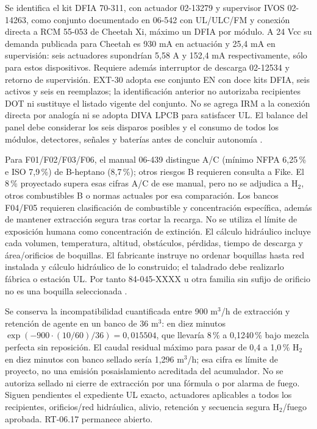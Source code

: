 Se identifica el kit DFIA 70-311, con actuador 02-13279 y supervisor IVOS 02-14263, como conjunto documentado en 06-542 con UL/ULC/FM y conexión directa a RCM 55-053 de Cheetah Xi, máximo un DFIA por módulo. A 24 Vcc su demanda publicada para Cheetah es 930 mA en actuación y 25,4 mA en supervisión: seis actuadores supondrían 5,58 A y 152,4 mA respectivamente, sólo para estos dispositivos. Requiere además interruptor de descarga 02-12534 y retorno de supervisión. EXT-30 adopta ese conjunto EN con doce kits DFIA, seis activos y seis en reemplazos; la identificación anterior no autorizaba recipientes DOT ni sustituye el listado vigente del conjunto. No se agrega IRM a la conexión directa por analogía ni se adopta DIVA LPCB para satisfacer UL. El balance del panel debe considerar los seis disparos posibles y el consumo de todos los módulos, detectores, señales y baterías antes de concluir autonomía \parencite[ficha~06-432-1-5-DF, pp.~1--6]{l27-fike-542}.

Para F01/F02/F03/F06, el manual 06-439 distingue A/C (mínimo NFPA 6,25\,\% e ISO 7,9\,\%) de B-heptano (8,7\,\%); otros riesgos B requieren consulta a Fike. El 8\,\% proyectado supera esas cifras A/C de ese manual, pero no se adjudica a H$_2$, otros combustibles B o normas actuales por esa comparación. Los bancos F04/F05 requieren clasificación de combustible y concentración específica, además de mantener extracción segura tras cortar la recarga. No se utiliza el límite de exposición humana como concentración de extinción. El cálculo hidráulico incluye cada volumen, temperatura, altitud, obstáculos, pérdidas, tiempo de descarga y área/orificios de boquillas. El fabricante instruye no ordenar boquillas hasta red instalada y cálculo hidráulico de lo construido; el taladrado debe realizarlo fábrica o estación UL. Por tanto 84-045-XXXX u otra familia sin sufijo de orificio no es una boquilla seleccionada \parencite[ficha~06-542-1-6, p.~1; sec.~2, pp.~1, 7--10]{l27-fike-439}.

Se conserva la incompatibilidad cuantificada entre 900 m$^3$/h de extracción y retención de agente en un banco de 36 m$^3$: en diez minutos $\exp(-900\cdot(10/60)/36)=0,015504$, que llevaría 8\,\% a 0,1240\,\% bajo mezcla perfecta sin reposición. El caudal residual máximo para pasar de 0,4 a 1,0\,\% H$_2$ en diez minutos con banco sellado sería 1,296 m$^3$/h; esa cifra es límite de proyecto, no una emisión posaislamiento acreditada del acumulador. No se autoriza sellado ni cierre de extracción por una fórmula o por alarma de fuego. Siguen pendientes el expediente UL exacto, actuadores aplicables a todos los recipientes, orificios/red hidráulica, alivio, retención y secuencia segura H$_2$/fuego aprobada. RT-06.17 permanece abierto.
